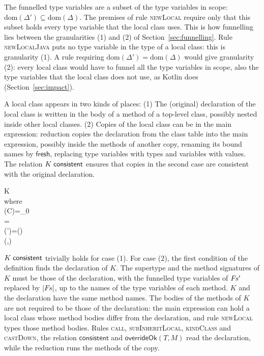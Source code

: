 The funnelled type variables are a subset of the type variables in scope: $\mathrm{dom}(\Delta')\subseteq\mathrm{dom}(\Delta)$.
The premises of rule \textsc{newLocal} require only that this subset holds every type variable that the local class uses.
This is how funnelling lies between the granularities (1) and (2) of Section~\ref{sec:funnelling}.
Rule \textsc{newLocalJava} puts no type variable in the type of a local class: this is granularity (1).
A rule requiring $\mathrm{dom}(\Delta')=\mathrm{dom}(\Delta)$ would give granularity (2): every local class would have to funnel all the type variables in scope, also the type variables that the local class does not use, as Kotlin does (Section~\ref{sec:impact}).

A local class appears in two kinds of places:
(1) The (original) declaration of the local class is written in the body of a method of a top-level class, possibly nested inside other local classes.
(2) Copies of the local class can be in the main expression: reduction copies the declaration from the class table into the main expression, possibly inside the methods of another copy, renaming its bound names by $\mathsf{fresh}$, replacing type variables with types and variables with values.
The relation $K\mskip5mu\mathsf{consistent}$ ensures that copies in the second case are consistent with the original declaration.
\begin{Define}{K\gap{}}
\gap{}\\
\quad\textrm{where }\\
\quad{}(C)=\Delta_0\\
\quad{}=\\
\quad{}(')=()\\
\quad{}(,)
\end{Define}
$K\mskip5mu\mathsf{consistent}$ trivially holds for case (1). For case (2), the first condition of the definition finds the declaration of $K$.
The supertype and the method signatures of $K$ must be those of the declaration, with the funnelled type variables of $F\mkern-2mu s'$ replaced by $|F\mkern-2mu s|$, up to the names of the type variables of each method.
$K$ and the declaration have the same method names.
The bodies of the methods of $K$ are not required to be those of the declaration: the main expression can hold a local class whose method bodies differ from the declaration, and rule \textsc{newLocal} types those method bodies.
Rules \textsc{call}, \textsc{subInheritLocal}, \textsc{kindClass} and \textsc{castDown}, the relation $\mathsf{consistent}$ and $\mathsf{overrideOk}(T,M)$ read the declaration, while the reduction runs the methods of the copy.


